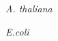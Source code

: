 \newcommand{\organism}[1]{\textit{#1}}
\newcommand{\ecoli}{\organism{E.coli}}

\organism{A. thaliana}

\ecoli
